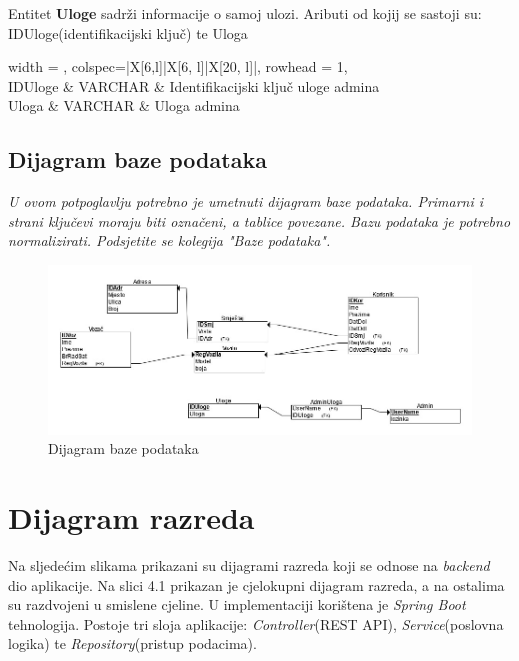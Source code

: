 				{Entitet \textbf{Uloge} sadrži informacije o samoj ulozi. Aributi od kojij se sastoji su: IDUloge(identifikacijski ključ) te Uloga}
				
				\begin{longtblr}[
					label=none,
					entry=none
					]{
						width = \textwidth,
						colspec={|X[6,l]|X[6, l]|X[20, l]|}, 
						rowhead = 1,
					} %
					\hline {}	 \\ \hline[3pt]
					IDUloge & VARCHAR	&  	Identifikacijski ključ uloge admina	\\ \hline
					Uloga	& VARCHAR & Uloga admina	\\ \hline 
					\end{longtblr}

			\subsection{Dijagram baze podataka}
				\textit{ U ovom potpoglavlju potrebno je umetnuti dijagram baze podataka. Primarni i strani ključevi moraju biti označeni, a tablice povezane. Bazu podataka je potrebno normalizirati. Podsjetite se kolegija "Baze podataka".}
			
			
			\begin{figure}[H]
				\includegraphics[width=\linewidth]{slike/DentAll_RelacijskiDijagramBaze.png}
				\centering
				\caption{Dijagram baze podataka}
				\label{fig:dijagramBaze}
			\end{figure}
			\eject
			
		\section{Dijagram razreda}
		
			{Na sljedećim slikama prikazani su dijagrami razreda koji se odnose na \textit{backend} dio aplikacije. Na slici 4.1 prikazan je cjelokupni dijagram razreda, a na ostalima su razdvojeni u smislene cjeline. U implementaciji korištena je \textit{Spring Boot} tehnologija. Postoje tri sloja aplikacije: \textit{Controller}(REST API), \textit{Service}(poslovna logika) te \textit{Repository}(pristup podacima). }\\
			
